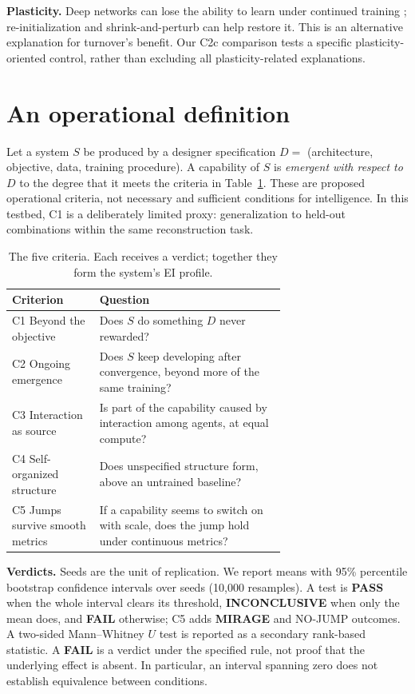 \documentclass[11pt]{article}
\newcommand{\pass}{\textbf{PASS}}
\newcommand{\fail}{\textbf{FAIL}}
\newcommand{\inc}{\textbf{INCONCLUSIVE}}
\newcommand{\mirage}{\textbf{MIRAGE}}
\begin{document}
\textbf{Plasticity.} Deep networks can lose the ability to learn under continued training
\cite{dohare2024}; re-initialization and shrink-and-perturb \cite{ash2020} can help restore it.
This is an alternative explanation for turnover's benefit. Our C2c comparison tests a specific
plasticity-oriented control, rather than excluding all plasticity-related explanations.

\section{An operational definition}\label{sec:def}

Let a system $S$ be produced by a designer specification $D = $ (architecture, objective, data,
training procedure). A capability of $S$ is \emph{emergent with respect to $D$} to the degree
that it meets the criteria in Table~\ref{tab:criteria}. These are proposed operational
criteria, not necessary and sufficient conditions for intelligence. In this testbed, C1 is a
deliberately limited proxy: generalization to held-out combinations within the same
reconstruction task.

\begin{table}[h]
\centering\small
\begin{tabular}{@{}lp{0.68\linewidth}@{}}
\toprule
Criterion & Question \\
\midrule
C1 Beyond the objective & Does $S$ do something $D$ never rewarded? \\
C2 Ongoing emergence & Does $S$ keep developing after convergence, beyond more of the same training? \\
C3 Interaction as source & Is part of the capability caused by interaction among agents, at equal compute? \\
C4 Self-organized structure & Does unspecified structure form, above an untrained baseline? \\
C5 Jumps survive smooth metrics & If a capability seems to switch on with scale, does the jump hold under continuous metrics? \\
\bottomrule
\end{tabular}
\caption{The five criteria. Each receives a verdict; together they form the system's EI profile.}
\label{tab:criteria}
\end{table}

\textbf{Verdicts.} Seeds are the unit of replication. We report means with 95\% percentile
bootstrap confidence intervals over seeds (10{,}000 resamples). A test is \pass{} when the whole
interval clears its threshold, \inc{} when only the mean does, and \fail{} otherwise; C5 adds
\mirage{} and NO-JUMP outcomes. A two-sided Mann--Whitney $U$ test is reported as a secondary
rank-based statistic. A \fail{} is a verdict under the specified rule, not proof that the
underlying effect is absent. In particular, an interval spanning zero does not establish
equivalence between conditions.
\end{document}
